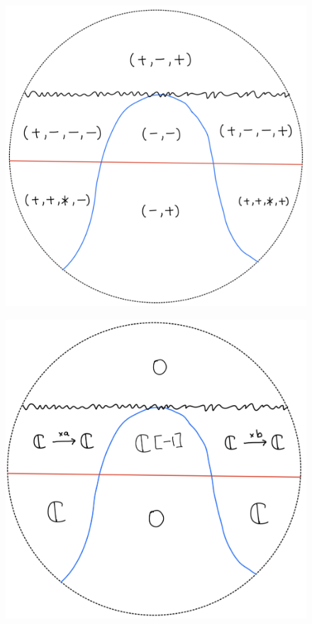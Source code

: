 \begin{figure}[H]
    \centering
    \includegraphics[scale = 0.45]{diagrams/lemma2/32.png} 
    \caption{}
    \label{fig:your-label}
\end{figure}
\begin{figure}[H]
    \centering
    \includegraphics[scale = 0.45]{diagrams/lemma2/33.png} 
    \caption{}
    \label{fig:your-label}
\end{figure}
